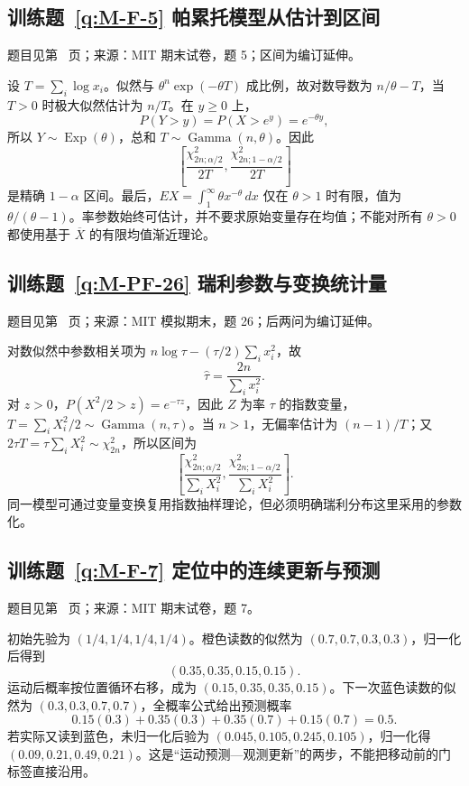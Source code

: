 \documentclass[UTF8,12pt,a4paper,fontset=fandol]{ctexbook}
\begin{document}
\subsection*{训练题~\ref{q:M-F-5} 帕累托模型从估计到区间}\label{a:M-F-5}{\small 题目见第~\pageref{q:M-F-5} 页；来源：MIT 期末试卷，题 5；区间为编订延伸。}
\begin{solve}设 $T=\sum_i\log x_i$。似然与 $\theta^n\exp(-\theta T)$ 成比例，故对数导数为 $n/\theta-T$，当 $T>0$ 时极大似然估计为 $n/T$。在 $y\ge0$ 上，\[P(Y>y)=P(X>e^y)=e^{-\theta y},\]所以 $Y\sim\operatorname{Exp}(\theta)$，总和 $T\sim\operatorname{Gamma}(n,\theta)$。因此\[\left[\frac{\chi^2_{2n;\alpha/2}}{2T},\frac{\chi^2_{2n;1-\alpha/2}}{2T}\right]\]是精确 $1-\alpha$ 区间。最后，$EX=\int_1^\infty\theta x^{-\theta}\,dx$ 仅在 $\theta>1$ 时有限，值为 $\theta/(\theta-1)$。率参数始终可估计，并不要求原始变量存在均值；不能对所有 $\theta>0$ 都使用基于 $\overline X$ 的有限均值渐近理论。\end{solve}

\subsection*{训练题~\ref{q:M-PF-26} 瑞利参数与变换统计量}\label{a:M-PF-26}{\small 题目见第~\pageref{q:M-PF-26} 页；来源：MIT 模拟期末，题 26；后两问为编订延伸。}
\begin{solve}对数似然中参数相关项为 $n\log\tau-(\tau/2)\sum_i x_i^2$，故\[\widehat\tau=\frac{2n}{\sum_i x_i^2}.\]对 $z>0$，$P(X^2/2>z)=e^{-\tau z}$，因此 $Z$ 为率 $\tau$ 的指数变量，$T=\sum_iX_i^2/2\sim\operatorname{Gamma}(n,\tau)$。当 $n>1$，无偏率估计为 $(n-1)/T$；又 $2\tau T=\tau\sum_iX_i^2\sim\chi^2_{2n}$，所以区间为\[\left[\frac{\chi^2_{2n;\alpha/2}}{\sum_iX_i^2},\frac{\chi^2_{2n;1-\alpha/2}}{\sum_iX_i^2}\right].\]同一模型可通过变量变换复用指数抽样理论，但必须明确瑞利分布这里采用的参数化。\end{solve}

\subsection*{训练题~\ref{q:M-F-7} 定位中的连续更新与预测}\label{a:M-F-7}{\small 题目见第~\pageref{q:M-F-7} 页；来源：MIT 期末试卷，题 7。}
\begin{solve}初始先验为 $(1/4,1/4,1/4,1/4)$。橙色读数的似然为 $(0.7,0.7,0.3,0.3)$，归一化后得到\[(0.35,0.35,0.15,0.15).\]运动后概率按位置循环右移，成为 $(0.15,0.35,0.35,0.15)$。下一次蓝色读数的似然为 $(0.3,0.3,0.7,0.7)$，全概率公式给出预测概率\[0.15(0.3)+0.35(0.3)+0.35(0.7)+0.15(0.7)=0.5.\]若实际又读到蓝色，未归一化后验为 $(0.045,0.105,0.245,0.105)$，归一化得 $(0.09,0.21,0.49,0.21)$。这是“运动预测—观测更新”的两步，不能把移动前的门标签直接沿用。\end{solve}
\end{document}
